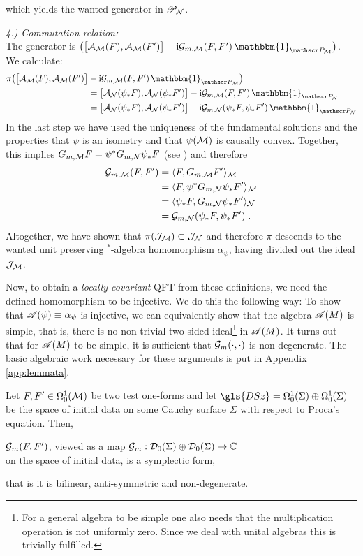 which yields the wanted generator in $\PPN$.\par
%
%
%
\textit{4.) Commutation relation:}\\
The generator is $\big ( \big[ \A_\M(F) , \A_\M( F') \big] - \i \GreenM{F}{F'}\,\mathbbm{1}_{\PPM} \big)$. We calculate:
\begin{align}
\pi   \big ( \big[ \A_\M(F) , \A_\M( F') \big] & - \i \GreenM{F}{F'}\,\mathbbm{1}_{\PPM} \big) \notag\\
&= \big[ \A_\N(\psi_* F) , \A_\N(\psi_* F') \big] - \i \GreenM{F}{F'}\,\mathbbm{1}_{\PPN}  \notag\\
&= \big[ \A_\N(\psi_* F) , \A_\N(\psi_* F') \big] - \i \GreenN{\psi_* F}{\psi_* F'}\,\mathbbm{1}_{\PPN}
\end{align}
In the last step we have used the uniqueness of the fundamental solutions and the properties that $\psi$ is an isometry and that $\psi(\M)$ is causally convex.
Together, this implies $G_{m,\M} F = \psi^* G_{m,\N} \psi_* F $ (see \cite[Chapter 4.3]{Sanders}) and therefore
\begin{align}
\GreenM{F}{F'}
&= \langle F, G_{m,\M} F' \rangle_\M \notag\\
&= \langle F, \psi^* G_{m,\N} \psi_* F' \rangle_\M\notag \\
&= \langle \psi_* F ,  G_{m,\N} \psi_* F' \rangle_\N \notag\\
&= \GreenN{\psi_*F}{\psi_* F'} \formspace.
\end{align}
%
%
Altogether, we have shown that $\pi(\mathcal{J}_\M)  \subset \mathcal{J}_\N$ and therefore $\pi$ descends to the wanted unit preserving $^*$-algebra homomorphism $\alpha_\psi$, having divided out the ideal $\mathcal{J}_\M$.\par
%
%
%
%
%
\newpage
Now, to obtain a \emph{locally covariant} QFT from these definitions, we need the defined homomorphism to be injective. We do this the following way:
To show that $\AA(\psi) \equiv \alpha_\psi$ is injective, we can equivalently show that the algebra $\AA(M)$ is simple, that is, there is no non-trivial two-sided ideal\footnote{For a general algebra to be simple one also needs that the multiplication operation is not uniformly zero. Since we deal with unital algebras this is trivially fulfilled.} in $\AA(M)$. It turns out that for $\AA(M)$ to be simple, it is sufficient that $\Green{\cdot}{\cdot}$ is non-degenerate. The basic algebraic work necessary for these arguments is put in Appendix \ref{app:lemmata}.
\begin{lemma}\label{lem:propagator-non-degenerate}
Let $F,F' \in \Omega^1_0(\M)$ be two test one-forms and let $\gls{DSz} = \Omega^1_0(\Sigma) \oplus  \Omega^1_0(\Sigma)$ be the space of initial data on some Cauchy surface $\Sigma$ with respect to Proca's equation.
Then,
\begin{center}
$\Green{F}{F'}$, viewed as a map $\mathcal{G}_m : \Dzs \oplus \Dzs \to \IC$\\ on the space of initial data, is a symplectic form,
\end{center}
 that is it is bilinear, anti-symmetric and non-degenerate.
\end{lemma}
